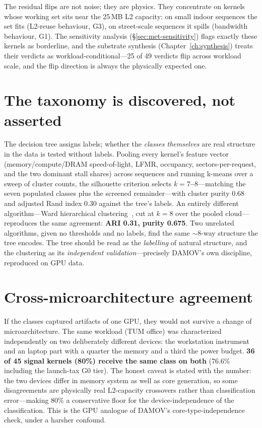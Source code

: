 The residual flips are not noise; they are physics. They concentrate on
kernels whose working set sits near the 25\,MB L2 capacity: on small indoor
sequences the set fits (L2-reuse behaviour, G3), on street-scale sequences
it spills (bandwidth behaviour, G1). The sensitivity analysis
(\S\ref{sec:met-sensitivity}) flags exactly these kernels as borderline, and
the substrate synthesis (Chapter~\ref{ch:synthesis}) treats their verdicts
as workload-conditional---25 of 49 verdicts flip across workload scale, and
the flip direction is always the physically expected one.

\section{The taxonomy is discovered, not asserted}
\label{sec:char-clustering}

The decision tree assigns labels; whether the \emph{classes themselves} are
real structure in the data is tested without labels. Pooling every kernel's
feature vector (memory/compute/DRAM speed-of-light, LFMR, occupancy,
sectors-per-request, and the two dominant stall shares) across sequences and
running k-means over a sweep of cluster counts, the silhouette criterion
selects \textbf{$k = 7$--$8$}---matching the seven populated classes plus
the screened remainder---with cluster purity 0.68 and adjusted Rand index
0.30 against the tree's labels. An entirely different algorithm---Ward
hierarchical clustering~\cite{ward1963}, cut at $k{=}8$ over the pooled
cloud---reproduces the same agreement: \textbf{ARI 0.31, purity 0.675}.
Two unrelated algorithms, given no thresholds and no labels, find the same
$\sim$8-way structure the tree encodes. The tree should be read as the
\emph{labelling} of natural structure, and the clustering as its
\emph{independent validation}---precisely DAMOV's own discipline, reproduced
on GPU data.

\section{Cross-microarchitecture agreement}
\label{sec:char-crossdev}

If the classes captured artifacts of one GPU, they would not survive a
change of microarchitecture. The same workload (TUM office) was
characterized independently on two deliberately different devices: the
 workstation instrument and an  laptop part with a
quarter the memory and a third the power budget. \textbf{36 of 45 signal
kernels (80\%) receive the same class on both} (76.6\% including the
launch-tax G0 tier). The honest caveat is stated with the number: the two
devices differ in memory system as well as core generation, so some
disagreements are physically real L2-capacity crossovers rather than
classification error---making 80\% a conservative floor for the
device-independence of the classification. This is the GPU analogue of
DAMOV's core-type-independence check, under a harsher confound.

